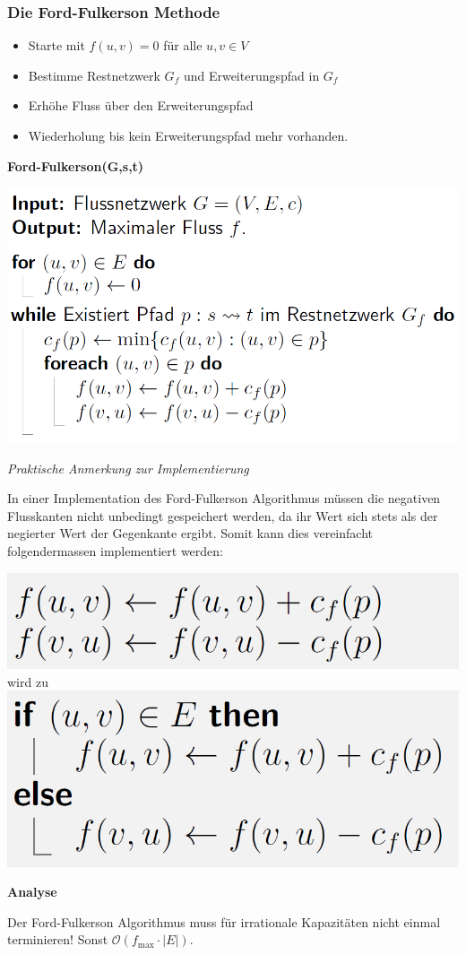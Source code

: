 \vspace{-4pt}
\begin{sectionbox}
\subsubsection{Die Ford-Fulkerson Methode}\smallskip
\begin{itemize}
    \item Starte mit $f(u, v)=0$ für alle $u, v \in V$
    \item Bestimme Restnetzwerk $G_{f}$ und Erweiterungspfad in $G_{f}$
    \item Erhöhe Fluss über den Erweiterungspfad
    \item Wiederholung bis kein Erweiterungspfad mehr vorhanden.
\end{itemize}\smallskip

\textbf{Ford-Fulkerson(G,s,t)}\par
\includegraphics[width = 0.8\columnwidth]{../img/FoFu.png}\par\smallskip

\textit{Praktische Anmerkung zur Implementierung}\par
In einer Implementation des Ford-Fulkerson Algorithmus müssen die negativen Flusskanten nicht unbedingt gespeichert werden, da ihr Wert sich stets als der negierter Wert der Gegenkante ergibt. Somit kann dies vereinfacht folgendermassen implementiert werden:\par\smallskip
\includegraphics[width = 0.45\columnwidth]{../img/paFF1.png} wird zu
\includegraphics[width = 0.4\columnwidth]{../img/paFF2.png}\par\smallskip

\textbf{Analyse}\par
Der Ford-Fulkerson Algorithmus muss für irrationale Kapazitäten nicht einmal terminieren! Sonst $\mathcal{O}\left(f_{\max }\cdot |E|\right)$.\vspace{10px}
\end{sectionbox}
